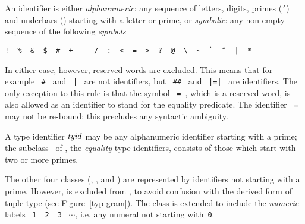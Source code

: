 An identifier is either {\sl alphanumeric}: any sequence of
letters, digits, primes ({\tt '}) and underbars (\wildpat) starting
with a letter or prime, or {\sl symbolic}: any non-empty sequence of the
following {\sl symbols}
\vspace*{-6pt}
\begin{center}
\verb(!  %  &  $  #  +  -  /  :  <  =  >  ?  @  \  ~  `  ^  |  *(
\end{center}
\vspace*{-6pt}
In either case, however, reserved words are excluded.   This means that for
example ~\verb+#+~ and ~{\tt |}~ are not identifiers, but  ~\verb+##+~ and
~{\tt |=|}~ are identifiers.
The only exception to this rule is that the symbol ~{\tt =}~, which is
a reserved word, is also allowed as an identifier to stand for
the equality predicate.
The identifier ~{\tt =}~ may not be re-bound;
this precludes any syntactic ambiguity.


A type identifier ${\it tyid}$\label{etyid-lab} may be any
alphanumeric identifier starting with a prime; the subclass \ETyId\ of
\TyId, the {\sl equality} type identifiers, consists of those which
start with two or more primes.  

The other four classes ({\VId}, {\TyCon}, {\Lab} and {\StrId}) are represented by identifiers
not starting with a prime. However, {\tt *} is excluded from {\TyCon},
to avoid confusion with the derived form of tuple type (see
Figure~\ref{typ-gram}). The class \Lab{} is extended to
include the {\em numeric} labels ~{\tt 1}~~{\tt 2}~~{\tt 3}~ $\cdots$,
i.e. any numeral not starting with~{\tt 0}.

